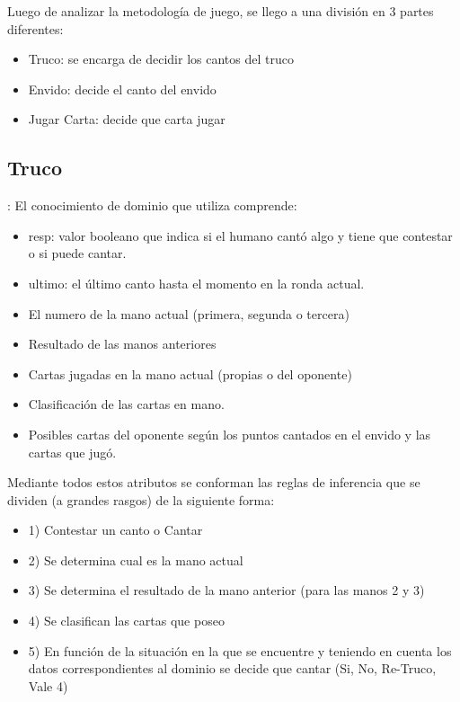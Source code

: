 \documentclass[12pt,a4paper]{article}
\begin{document}
Luego de analizar la metodolog\'ia de juego, se llego a una divisi\'on en 3 partes diferentes:
\begin{itemize}
\item Truco: se encarga de decidir los cantos del truco
\item Envido: decide el canto del envido
\item Jugar Carta: decide que carta jugar
\end{itemize}
 

\subsection{Truco}:
El conocimiento de dominio que utiliza comprende:
\begin{itemize}
\item resp: valor booleano que indica si el humano cantó algo y tiene que contestar o si puede cantar.
\item ultimo: el último canto hasta el momento en la ronda actual.
\item El numero de la mano actual (primera, segunda o tercera)
\item Resultado de las manos anteriores
\item Cartas jugadas en la mano actual (propias o del oponente)
\item Clasificación de las cartas en mano.
\item Posibles cartas del oponente según los puntos cantados en el envido y las cartas que jugó.
\end{itemize}

Mediante todos estos atributos se conforman las reglas de inferencia que se dividen (a grandes rasgos) de la 
siguiente forma:

\begin{itemize}
\item 1) Contestar un canto o Cantar
\item 2) Se determina cual es la mano actual
\item 3) Se determina el resultado de la mano anterior (para las manos 2 y 3)
\item 4) Se clasifican las cartas que poseo
\item 5) En función de la situación en la que se encuentre y teniendo en cuenta los datos correspondientes al dominio
	   se decide que cantar (Si, No, Re-Truco, Vale 4)
\end{itemize}
\end{document}
